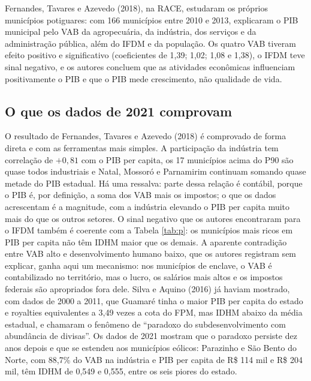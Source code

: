 \documentclass[12pt,a4paper]{article}
\begin{document}
Fernandes, Tavares e Azevedo (2018), na RACE, estudaram os próprios municípios potiguares: com 166 municípios entre 2010 e 2013, explicaram o PIB municipal pelo VAB da agropecuária, da indústria, dos serviços e da administração pública, além do IFDM e da população. Os quatro VAB tiveram efeito positivo e significativo (coeficientes de 1,39; 1,02; 1,08 e 1,38), o IFDM teve sinal negativo, e os autores concluem que as atividades econômicas influenciam positivamente o PIB e que o PIB mede crescimento, não qualidade de vida.

\subsection{O que os dados de 2021 comprovam}

O resultado de Fernandes, Tavares e Azevedo (2018) é comprovado de forma direta e com as ferramentas mais simples. A participação da indústria tem correlação de $+0{,}81$ com o PIB per capita, os 17 municípios acima do P90 são quase todos industriais e Natal, Mossoró e Parnamirim continuam somando quase metade do PIB estadual. Há uma ressalva: parte dessa relação é contábil, porque o PIB é, por definição, a soma dos VAB mais os impostos; o que os dados acrescentam é a magnitude, com a indústria elevando o PIB per capita muito mais do que os outros setores. O sinal negativo que os autores encontraram para o IFDM também é coerente com a Tabela \ref{tab:p}: os municípios mais ricos em PIB per capita não têm IDHM maior que os demais. A aparente contradição entre VAB alto e desenvolvimento humano baixo, que os autores registram sem explicar, ganha aqui um mecanismo: nos municípios de enclave, o VAB é contabilizado no território, mas o lucro, os salários mais altos e os impostos federais são apropriados fora dele. Silva e Aquino (2016) já haviam mostrado, com dados de 2000 a 2011, que Guamaré tinha o maior PIB per capita do estado e royalties equivalentes a 3,49 vezes a cota do FPM, mas IDHM abaixo da média estadual, e chamaram o fenômeno de ``paradoxo do subdesenvolvimento com abundância de divisas''. Os dados de 2021 mostram que o paradoxo persiste dez anos depois e que se estendeu aos municípios eólicos: Parazinho e São Bento do Norte, com 88,7\% do VAB na indústria e PIB per capita de R\$ 114 mil e R\$ 204 mil, têm IDHM de 0,549 e 0,555, entre os seis piores do estado.
\end{document}
